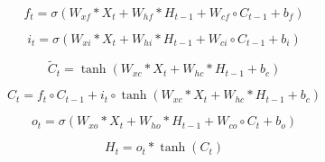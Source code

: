 \begin{equation}
f_t = \sigma(W_{xf} * X_t + W_{hf} * H_{t-1} + W_{cf} \circ C_{t-1} + b_f)
\label{eq:ConvLSTM_forget_gate}
\end{equation}

\begin{equation}
i_t = \sigma(W_{xi} * X_t + W_{hi} * H_{t-1} + W_{ci} \circ C_{t-1} + b_i)
\label{eq:ConvLSTM_ipnut_gate}
\end{equation}

\begin{equation}
\widetilde{C}_t = \tanh(W_{xc} * X_t + W_{hc} * H_{t-1} + b_c)
\label{eq:ConvLSTM_input_modulation_gate}
\end{equation}

\begin{equation}
C_t = f_t \circ C_{t-1} + i_t \circ \tanh(W_{xc} * X_t + W_{hc} * H_{t-1} + b_c)
\label{eq:ConvLSTM_Cellstate_modification}
\end{equation}

\begin{equation}
o_t = \sigma(W_{xo} * X_t + W_{ho} * H_{t-1} + W_{co} \circ C_{t} + b_o)
\label{eq:ConvLSTM_output_gate}
\end{equation}

\begin{equation}
H_t = o_t * \tanh(C_t)
\label{eq:ConvLSTM_output}
\end{equation}







\endinput